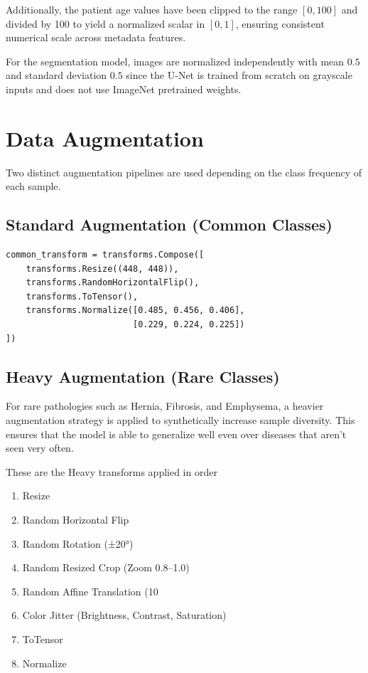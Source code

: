 Additionally, the patient age values have been clipped to the range $[0, 100]$ and divided by 100 to yield a normalized scalar in $[0,1]$, ensuring consistent numerical scale across metadata features.

For the segmentation model, images are normalized independently with mean $0.5$ and standard deviation $0.5$ since the U-Net is trained from scratch on grayscale inputs and does not use ImageNet pretrained weights.

\section{Data Augmentation}

Two distinct augmentation pipelines are used depending on the class frequency of each sample.

\subsection{Standard Augmentation (Common Classes)}

\begin{lstlisting}[style=pythonstyle, caption={Standard augmentation pipeline}]
common_transform = transforms.Compose([
    transforms.Resize((448, 448)),
    transforms.RandomHorizontalFlip(),
    transforms.ToTensor(),
    transforms.Normalize([0.485, 0.456, 0.406],
                         [0.229, 0.224, 0.225])
])
\end{lstlisting}

\subsection{Heavy Augmentation (Rare Classes)}

For rare pathologies such as Hernia, Fibrosis, and Emphysema, a heavier augmentation strategy is applied to synthetically increase sample diversity. This ensures that the model is able to generalize well even over diseases that aren't seen very often.

These are the Heavy transforms applied in order
\begin{enumerate}
    \item Resize
    \item Random Horizontal Flip
    \item Random Rotation (±20°)
    \item Random Resized Crop (Zoom 0.8–1.0)
    \item Random Affine Translation (10%
    \item Color Jitter (Brightness, Contrast, Saturation)
    \item ToTensor 
    \item Normalize

\end{enumerate}

